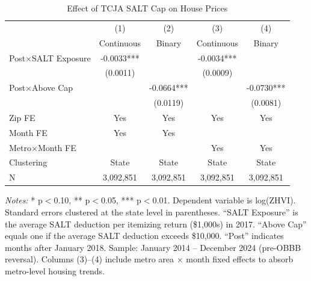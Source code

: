 \begin{table}[H]
\centering
\caption{Effect of TCJA SALT Cap on House Prices}
\begin{threeparttable}
\begin{tabular}{lcccc}
\toprule
 & (1) & (2) & (3) & (4) \\
 & Continuous & Binary & Continuous & Binary \\
\midrule
Post$\times$SALT Exposure & -0.0033*** & & -0.0034*** & \\
 & (0.0011) & & (0.0009) & \\
Post$\times$Above Cap & & -0.0664*** & & -0.0730*** \\
 & & (0.0119) & & (0.0081) \\
\midrule
Zip FE & Yes & Yes & Yes & Yes \\
Month FE & Yes & Yes & & \\
Metro$\times$Month FE & & & Yes & Yes \\
Clustering & State & State & State & State \\
N & 3,092,851 & 3,092,851 & 3,092,851 & 3,092,851 \\
\bottomrule
\end{tabular}
\begin{tablenotes}[flushleft]
\small
\item \textit{Notes:} * p$<$0.10, ** p$<$0.05, *** p$<$0.01. Dependent variable is log(ZHVI). Standard errors clustered at the state level in parentheses. ``SALT Exposure'' is the average SALT deduction per itemizing return (\$1,000s) in 2017. ``Above Cap'' equals one if the average SALT deduction exceeds \$10,000. ``Post'' indicates months after January 2018. Sample: January 2014 -- December 2024 (pre-OBBB reversal). Columns (3)--(4) include metro area $\times$ month fixed effects to absorb metro-level housing trends.
\end{tablenotes}
\end{threeparttable}
\label{tab:tcja}
\end{table}

